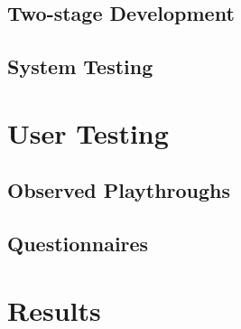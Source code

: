 \documentclass[a4paper,11.5pt]{report}
\numberwithin{figure}{section}
\numberwithin{table}{section}
\numberwithin{equation}{section}
\numberwithin{equation}{section}
\newcommand\blankpage{%
    \null
    \thispagestyle{empty}%
    \addtocounter{page}{-1}%
    \newpage}
\begin{document}








\section{Two-stage Development}

\section{System Testing}


\afterpage{\blankpage}




\chapter{User Testing}

\section{Observed Playthroughs} %
\section{Questionnaires}



\afterpage{\blankpage}




\chapter{Results}
\end{document}
